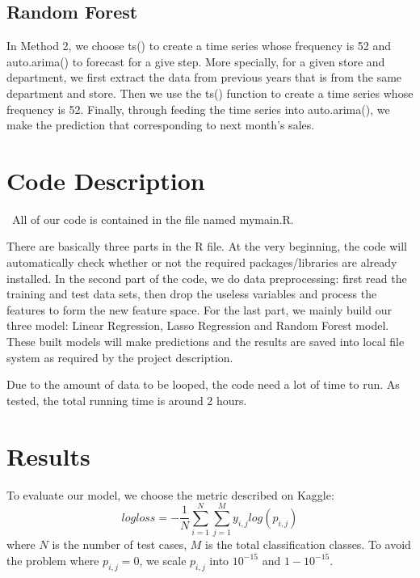 \documentclass[12pt]{article}
\begin{document}
\subsection{Random Forest}
In Method 2, we choose ts() to create a time series whose frequency is 52 and auto.arima() to forecast for a give step. More specially, for a given store and department, we first extract the data from previous years that is from the same department and store. Then we use the ts() function to create a time series whose frequency is 52. Finally, through feeding the time series into auto.arima(), we make the prediction that corresponding to next month's sales.





\section{Code Description}
\quad\ All of our code is contained in the file named mymain.R. 


There are basically three parts in the R file. At the very beginning, the code will automatically check whether or not the required packages/libraries are already installed. In the second part of the code, we do data preprocessing: first read the training and test data sets, then drop the useless variables and process the features to form the new feature space. For the last part, we mainly build our three model: Linear Regression, Lasso Regression and Random Forest model. These built models will make predictions and the results are saved into local file system as required by the project description.

Due to the amount of data to be looped, the code need a lot of time to run. As tested, the total running time is around 2 hours.

\section{Results}

To evaluate our model, we choose the metric described on Kaggle:
\begin{equation}
logloss = - \frac{1}{N} \sum_{i=1}^N \sum_{j=1}^M y_{i, j} log(p_{i, j})
\end{equation}
where $N$ is the number of test cases, $M$ is the total classification classes. To avoid the problem where $p_{i, j} = 0$, we scale $p_{i, j}$ into $10 ^ {-15}$ and $1 - 10 ^ {-15}$.
\end{document}
